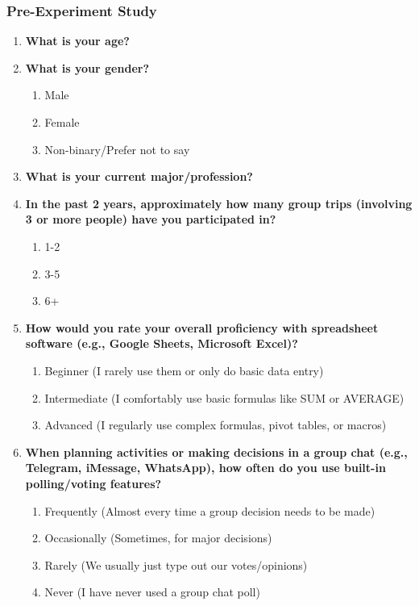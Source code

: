\documentclass[12pt,a4paper]{article}
\begin{document}
\subsubsection{Pre-Experiment Study}
\begin{enumerate}
    \item \textbf{What is your age?}

    \item {\textbf{What is your gender?}
        \begin{enumerate}
            \item Male
            \item Female
            \item Non-binary/Prefer not to say
        \end{enumerate}
        
    }

    \item \textbf{What is your current major/profession?}

    \item {\textbf{In the past 2 years, approximately how many group trips (involving 3 or more people) have you participated in?}
        \begin{enumerate}
            \item 1-2 
            \item 3-5
            \item 6+
        \end{enumerate}
        
    }

    \item {\textbf{How would you rate your overall proficiency with spreadsheet software (e.g., Google Sheets, Microsoft Excel)?}
        \begin{enumerate}
            \item Beginner (I rarely use them or only do basic data entry)
            \item Intermediate (I comfortably use basic formulas like SUM or AVERAGE)
            \item Advanced (I regularly use complex formulas, pivot tables, or macros)
        \end{enumerate}
        
    }

    \item {\textbf{When planning activities or making decisions in a group chat (e.g., Telegram, iMessage, WhatsApp), how often do you use built-in polling/voting features?}
        \begin{enumerate}
            \item Frequently (Almost every time a group decision needs to be made)
            \item Occasionally (Sometimes, for major decisions)
            \item Rarely (We usually just type out our votes/opinions)
            \item Never (I have never used a group chat poll)
            

\end{enumerate}}
\end{enumerate}
\end{document}
